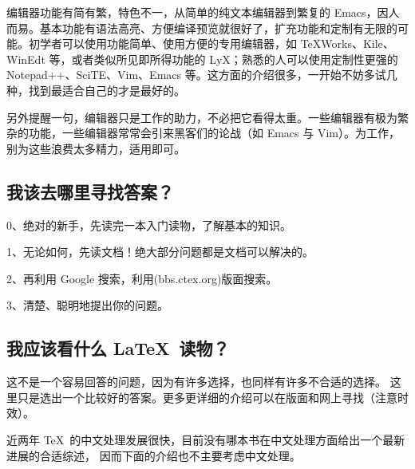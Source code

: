 编辑器功能有简有繁，特色不一，从简单的纯文本编辑器到繁复的 Emacs，因人而易。基本功能有语法高亮、方便编译预览就很好了，扩充功能和定制有无限的可能。初学者可以使用功能简单、使用方便的专用编辑器，如 TeXWorks、Kile、WinEdt 等，或者类似所见即所得功能的 LyX；熟悉的人可以使用定制性更强的 Notepad++、SciTE、Vim、Emacs 等。这方面的介绍很多，一开始不妨多试几种，找到最适合自己的才是最好的。

另外提醒一句，编辑器只是工作的助力，不必把它看得太重。一些编辑器有极为繁杂的功能，一些编辑器常常会引来黑客们的论战（如 Emacs 与 Vim）。为工作，别为这些浪费太多精力，适用即可。

\subsection{我该去哪里寻找答案？}

0、绝对的新手，先读完一本入门读物，了解基本的知识。

1、无论如何，先读文档！绝大部分问题都是文档可以解决的。

2、再利用 Google 搜索，利用(bbs.ctex.org)版面搜索。

3、清楚、聪明地提出你的问题。


\subsection{我应该看什么 \LaTeX\ 读物？}

这不是一个容易回答的问题，因为有许多选择，也同样有许多不合适的选择。
这里只是选出一个比较好的答案。更多更详细的介绍可以在版面和网上寻找（注意时效）。

近两年 \TeX\ 的中文处理发展很快，目前没有哪本书在中文处理方面给出一个最新进展的合适综述，
因而下面的介绍也不主要考虑中文处理。

